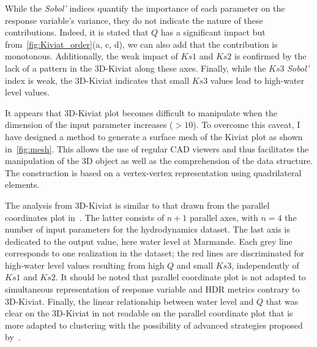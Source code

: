 While the \emph{Sobol'} indices quantify the importance of each parameter on the response variable's variance, they do not indicate the nature of these contributions. Indeed, it is stated that $Q$ has a significant impact but from~\cref{fig:Kiviat_order}(a, c, d), we can also add that the contribution is monotonous. Additionally, the weak impact of $Ks1$ and $Ks2$ is confirmed by the lack of a pattern in the 3D-Kiviat along these axes. Finally, while the $Ks3$ \emph{Sobol'} index is weak, the 3D-Kiviat indicates that small $Ks3$ values lead to high-water level values.

It appears that 3D-Kiviat plot becomes difficult to manipulate when the dimension of the input parameter increases ($>10$). To overcome this caveat, I have designed a method to generate a surface mesh of the Kiviat plot as shown in~\cref{fig:mesh}. This allows the use of regular CAD viewers and thus facilitates the manipulation of the 3D object as well as the comprehension of the data structure. The construction is based on a vertex-vertex representation using quadrilateral elements. %

The analysis from 3D-Kiviat is similar to that drawn from the parallel coordinates plot in~. The latter consists of $n+1$ parallel axes, with $n=4$ the number of input parameters for the hydrodynamics dataset. The last axis is dedicated to the output value, here water level at Marmande. Each grey line corresponds to one realization in the dataset; the red lines are discriminated for high-water level values resulting from high $Q$ and small $Ks3$, independently of $Ks1$ and $Ks2$. It should be noted that parallel coordinate plot is not adapted to simultaneous representation of response variable and HDR metrics contrary to 3D-Kiviat. Finally, the linear relationship between water level and $Q$ that was clear on the 3D-Kiviat in not readable on the parallel coordinate plot that is more adapted to clustering with the possibility of advanced strategies proposed by~\citep{Claessen2011,Raidou2016}.


